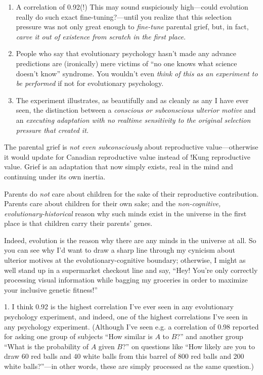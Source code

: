 \begin{enumerate}
\item {
 A correlation of 0.92(!) This may sound suspiciously high---could
evolution really do such exact fine-tuning?---until you realize that
this selection pressure was not only great enough to \textit{fine-tune}
parental grief, but, in fact, \textit{carve it out of existence from
scratch in the first place.}}

\item {
 People who say that evolutionary psychology hasn't
made any advance predictions are (ironically) mere victims of
``no one knows what science doesn't
know'' syndrome. You wouldn't even
\textit{think of this as an experiment to be performed} if not for
evolutionary psychology.}

\item {
 The experiment illustrates, as beautifully and as cleanly as any I
have ever seen, the distinction between a \textit{conscious or
subconscious ulterior motive} and an \textit{executing adaptation with
no realtime sensitivity to the original selection pressure that created
it.}}

\end{enumerate}


 The parental grief is \textit{not even subconsciously} about
reproductive value---otherwise it would update for Canadian
reproductive value instead of !Kung reproductive value. Grief is an
adaptation that now simply exists, real in the mind and continuing
under its own inertia.


 Parents do \textit{not} care about children for the sake of their
reproductive contribution. Parents care about children for their own
sake; and the \textit{non-cognitive, evolutionary-historical} reason
why such minds exist in the universe in the first place is that
children carry their parents' genes.


 Indeed, evolution is the reason why there are any minds in the
universe at all. So you can see why I'd want to draw a
sharp line through my cynicism about ulterior motives at the
evolutionary-cognitive boundary; otherwise, I might as well stand up in
a supermarket checkout line and say, ``Hey!
You're only correctly processing visual information
while bagging my groceries in order to maximize your inclusive genetic
fitness!''


 1. I think 0.92 is the highest correlation I've
ever seen in any evolutionary psychology experiment, and indeed, one of
the highest correlations I've seen in any psychology
experiment. (Although I've seen e.g. a correlation of
0.98 reported for asking one group of subjects ``How
similar is $A$ to $B$?'' and another group
``What is the probability of $A$ given
$B$?'' on questions like ``How likely
are you to draw 60 red balls and 40 white balls from this barrel of 800
red balls and 200 white balls?''---in other words,
these are simply processed as the same question.)


